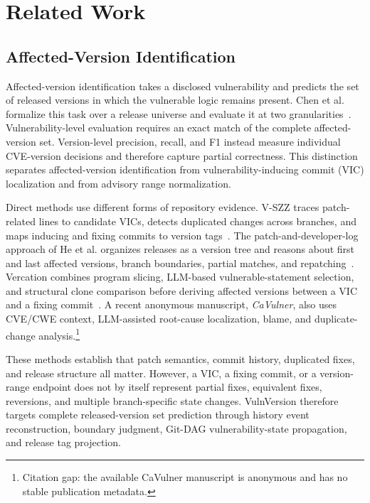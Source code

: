 \section{Related Work}
\label{sec:related}

\subsection{Affected-Version Identification}

Affected-version identification takes a disclosed vulnerability and predicts the set of released versions in which the vulnerable logic remains present. Chen et al. formalize this task over a release universe and evaluate it at two granularities~\cite{howfar2025}. Vulnerability-level evaluation requires an exact match of the complete affected-version set. Version-level precision, recall, and F1 instead measure individual CVE-version decisions and therefore capture partial correctness. This distinction separates affected-version identification from vulnerability-inducing commit (VIC) localization and from advisory range normalization.

Direct methods use different forms of repository evidence. V-SZZ traces patch-related lines to candidate VICs, detects duplicated changes across branches, and maps inducing and fixing commits to version tags~\cite{vszz2022}. The patch-and-developer-log approach of He et al. organizes releases as a version tree and reasons about first and last affected versions, branch boundaries, partial matches, and repatching~\cite{tdsc2024}. Vercation combines program slicing, LLM-based vulnerable-statement selection, and structural clone comparison before deriving affected versions between a VIC and a fixing commit~\cite{vercation2026}. A recent anonymous manuscript, \emph{CaVulner}, also uses CVE/CWE context, LLM-assisted root-cause localization, blame, and duplicate-change analysis.\footnote{Citation gap: the available CaVulner manuscript is anonymous and has no stable publication metadata.}

These methods establish that patch semantics, commit history, duplicated fixes, and release structure all matter. However, a VIC, a fixing commit, or a version-range endpoint does not by itself represent partial fixes, equivalent fixes, reversions, and multiple branch-specific state changes. VulnVersion therefore targets complete released-version set prediction through history event reconstruction, boundary judgment, Git-DAG vulnerability-state propagation, and release tag projection.

